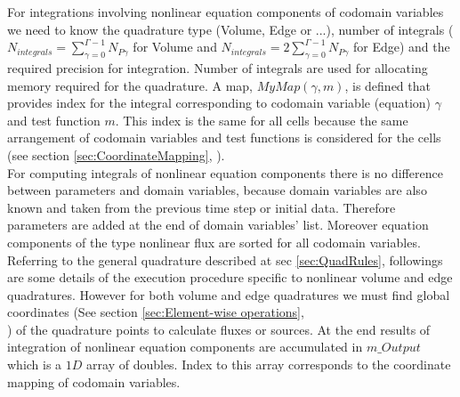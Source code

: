 \documentclass[BoSSSForSolvingConservationLaws.tex]{subfiles}
\begin{document}
For integrations involving nonlinear equation components of codomain variables we need to know the quadrature type (Volume, Edge or ...), number of integrals ($N_{integrals}=\sum_{\gamma=0}^{\Gamma-1} N_{P\gamma}$ for Volume and $N_{integrals}=2\sum_{\gamma=0}^{\Gamma-1} N_{P\gamma}$ for Edge) and the required precision for integration. Number of integrals are used for allocating memory required for the quadrature. A map, $MyMap(\gamma,m)$, is defined that provides index for the integral corresponding to codomain variable (equation) $\gamma$ and test function $m$. This index is the same for all cells because the same arrangement of codomain variables and test functions is considered for the cells (see section \ref{sec:CoordinateMapping}, ).\\
For computing integrals of nonlinear equation components there is no difference between parameters and domain variables, because domain variables are also known and taken from the previous time step or initial data. Therefore parameters are added at the end of domain variables' list. Moreover equation components of the type nonlinear flux are sorted for all codomain variables.\\
Referring to the general quadrature described at sec \ref{sec:QuadRules}, followings are some details of the execution procedure specific to nonlinear volume and edge quadratures. However for both volume and edge quadratures we must find global coordinates (See section \ref{sec:Element-wise operations},\\ ) of the quadrature points to calculate fluxes or sources. At the end results of integration of nonlinear equation components are accumulated in $m\_Output$ which is a $1D$ array of doubles. Index to this array corresponds to the coordinate mapping of codomain variables.
\end{document}
